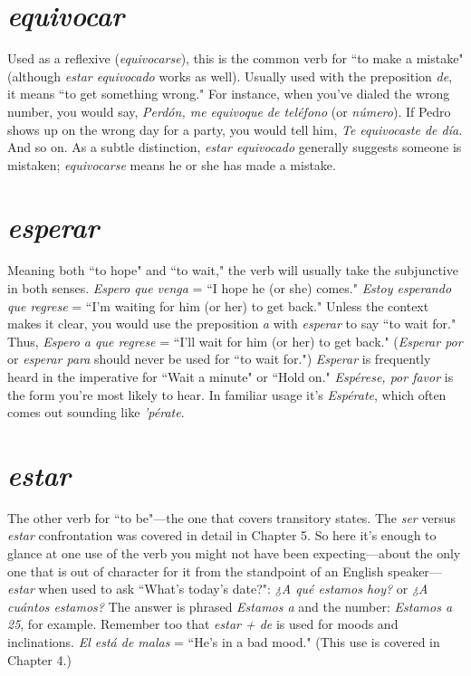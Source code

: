 \section{\emph{equivocar}}

Used as a reflexive (\emph{equivocarse}), this is the common verb for
``to make a mistake" (although \emph{estar equivocado} works as well). Usually used with the preposition \emph{de}, it means ``to get something wrong."
For instance, when you've dialed the wrong number, you would say,
\emph{Perdón, me equivoque de teléfono} (or \emph{número}). If Pedro shows up on
the wrong day for a party, you would tell him, \emph{Te equivocaste de día}.
And so on. As a subtle distinction, \emph{estar equivocado} generally suggests someone is mistaken; \emph{equivocarse} means he or she has made a
mistake.

\section{\emph{esperar}}

Meaning both ``to hope" and ``to wait," the verb will usually
take the subjunctive in both senses. \emph{Espero que venga} = ``I hope he (or
she) comes." \emph{Estoy esperando que regrese} = ``I'm waiting for him (or
her) to get back." Unless the context makes it clear, you would use the
preposition \emph{a} with \emph{esperar} to say ``to wait for." Thus, \emph{Espero a que
	regrese} = ``I'll wait for him (or her) to get back." (\emph{Esperar por} or \emph{esperar para} should never be used for ``to wait for.") \emph{Esperar} is frequently
heard in the imperative for ``Wait a minute" or ``Hold on." \emph{Espérese,
	por favor} is the form you're most likely to hear. In familiar usage it's
\emph{Espérate}, which often comes out sounding like \emph{'pérate}.

\section{\emph{estar}}

The other verb for ``to be"---the one that covers transitory
states. The \emph{ser} versus \emph{estar} confrontation was covered in detail in
Chapter 5. So here it's enough to glance at one use of the verb you
might not have been expecting---about the only one that is out of character for it from the standpoint of an English speaker---\emph{estar} when
used to ask ``What's today's date?": \emph{¿A qué estamos hoy?} or \emph{¿A cuántos
	estamos?} The answer is phrased \emph{Estamos a} and the number: \emph{Estamos
	a 25}, for example. Remember too that \emph{estar + de} is used for moods
and inclinations. \emph{El está de malas} = ``He's in a bad mood." (This use
is covered in Chapter 4.)

